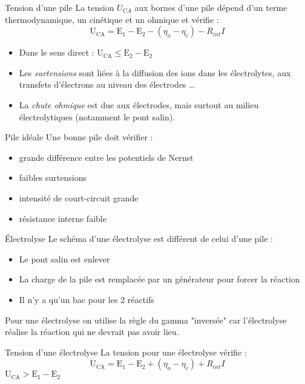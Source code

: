 \documentclass[french, a4paper, 11pt, twocolumn]{article}
\begin{document}
    \begin{cadre}{Tension d'une pile}
        La tension \(U_{CA}\) aux bornes d'une pile dépend d'un terme
        thermodynamique, un cinétique et un ohmique et vérifie : 
            \[\mathrm{U_{CA}=E_1-E_2}-(\eta_a-\eta_c)-R_{int}I\]
        
        \tcblower
        \begin{itemize}
            \item Dans le sens direct : \(\mathrm{U_{CA}\leq E_2-E_2}\)
            \item Les \emph{surtensions} sont liées à la diffusion des ions dans les électrolytes,
                aux transfets d'électrons au niveau des électrodes \dots
            \item La \emph{chute ohmique} est due aux électrodes, mais surtout au milieu électrolytiques (notamment le pont salin).
        \end{itemize}
    \end{cadre}

    \begin{cadre}{Pile idéale}
        Une bonne pile doit vérifier :
        \begin{itemize}
            \item grande différence entre les potentiels de Nernst
            \item faibles surtensions
            \item intensité de court-circuit grande
            \item résistance interne faible
        \end{itemize}
    \end{cadre}

    \begin{cadre}{Électrolyse}
        Le schéma d'une électrolyse est différent de celui d'une pile :
            \begin{itemize}
                \item Le pont salin est enlever
                \item La charge de la pile est remplacée par un générateur pour forcer la réaction
                \item Il n'y a qu'un bac pour les 2 réactifs
            \end{itemize}

        \tcblower
        Pour une électrolyse on utilise la règle du gamma "inversée" car l'électrolyse réalise
        la réaction qui ne devrait pas avoir lieu.
    \end{cadre}

    \begin{cadre}{Tension d'une électrolyse}
        La tension pour une électrolyse vérifie :
            \[\mathrm{U_{CA}=E_1-E_2}+(\eta_a-\eta_c)+R_{int}I\]
        \tcblower
            \(\mathrm{U_{CA}>E_1-E_2}\)
    \end{cadre}
\end{document}
